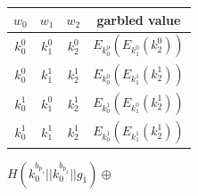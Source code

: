 \begin{tabular}{ c | c || c || c }
    \hline
    $w_0$ & $w_1$ & $w_2$ & garbled value \\
    \hline
    $k^0_0$ & $k^0_1$ & $k^0_2$ & $E_{k^0_0}(E_{k^0_1}(k^0_2))$\\
    \hline
    $k^0_0$ & $k^1_1$ & $k^1_2$ & $E_{k^0_0}(E_{k^1_1}(k^1_2))$\\
    \hline
    $k^1_0$ & $k^0_1$ & $k^1_2$ & $E_{k^1_0}(E_{k^0_1}(k^1_2))$\\
    \hline
    $k^1_0$ & $k^1_1$ & $k^1_2$ & $E_{k^1_0}(E_{k^1_1}(k^1_2))$\\
    \hline
\end{tabular}


$H(k^{b_{p_1}}_0 || k^{b_{p_2}}_0 || g_1) \oplus$
